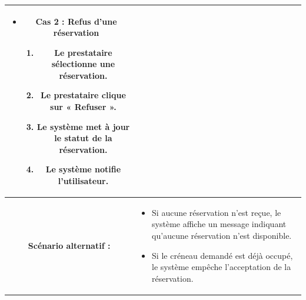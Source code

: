 \begin{longtable}{|c|p{11cm}|}
\begin{enumerate}
\begin{itemize}
\item \textbf{Cas 2 : Refus d’une réservation}
\begin{enumerate}
\item Le prestataire sélectionne une réservation.
\item Le prestataire clique sur « Refuser ».
\item Le système met à jour le statut de la réservation.
\item Le système notifie l’utilisateur.
\end{enumerate}

\end{itemize}

\end{enumerate} \\
\hline

\cellcolor{coloranicare} \textbf{Scénario alternatif :} &
\begin{itemize}
\item Si aucune réservation n’est reçue, le système affiche un message indiquant qu’aucune réservation n’est disponible.
\item Si le créneau demandé est déjà occupé, le système empêche l’acceptation de la réservation.
\end{itemize} \\
\hline

\end{longtable} 
\newpage 
